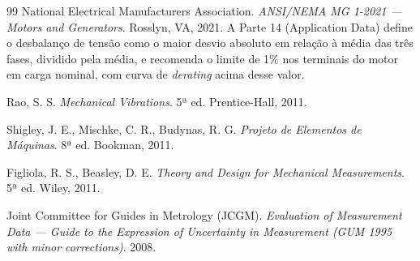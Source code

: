\documentclass[12pt,a4paper]{article}
\numberwithin{equation}{section}
\numberwithin{table}{section}
\numberwithin{figure}{section}
\begin{document}
\begin{thebibliography}{99}
 National Electrical Manufacturers Association. \textit{ANSI/NEMA MG 1-2021 — Motors and Generators}. Rosslyn, VA, 2021. A Parte 14 (Application Data) define o desbalanço de tensão como o maior desvio absoluto em relação à média das três fases, dividido pela média, e recomenda o limite de 1\% nos terminais do motor em carga nominal, com curva de \textit{derating} acima desse valor.

 Rao, S. S. \textit{Mechanical Vibrations}. 5ª ed. Prentice-Hall, 2011.

 Shigley, J. E., Mischke, C. R., Budynas, R. G. \textit{Projeto de Elementos de Máquinas}. 8ª ed. Bookman, 2011.

 Figliola, R. S., Beasley, D. E. \textit{Theory and Design for Mechanical Measurements}. 5ª ed. Wiley, 2011.

 Joint Committee for Guides in Metrology (JCGM). \textit{Evaluation of Measurement Data — Guide to the Expression of Uncertainty in Measurement (GUM 1995 with minor corrections)}. 2008.

\end{thebibliography}
\end{document}
